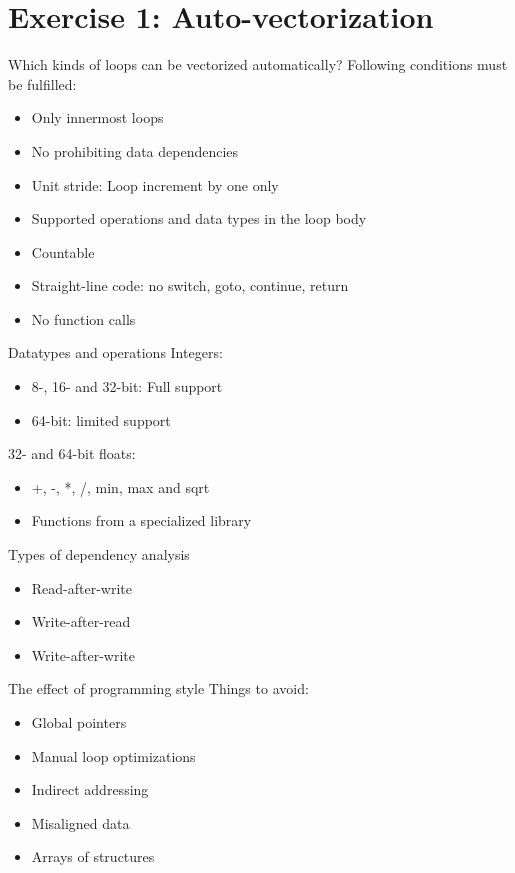 \section{Exercise 1: Auto-vectorization}

\begin{frame}{Which kinds of loops can be vectorized automatically?}
Following conditions must be fulfilled:
\begin{itemize}
\item Only innermost loops
\item No prohibiting data dependencies
\item Unit stride: Loop increment by one only
\item Supported operations and data types in the loop body
\item Countable
\item Straight-line code: no switch, goto, continue, return
\item No function calls
\end{itemize}
\end{frame}


\begin{frame}{Datatypes and operations}
Integers: 
\begin{itemize}
	\item 8-, 16- and 32-bit: Full support
	\item 64-bit: limited support
\end{itemize}
32- and 64-bit floats: 
\begin{itemize}
	\item +, -, *, /, min, max and sqrt
	\item Functions from a specialized library
\end{itemize}
\end{frame}

\begin{frame}{Types of dependency analysis}
\begin{itemize}
	\item Read-after-write
	\item Write-after-read
	\item Write-after-write
\end{itemize}
\end{frame}


\begin{frame}{The effect of programming style}
Things to avoid:
\begin{itemize}
	\item Global pointers
	\item Manual loop optimizations
	\item Indirect addressing
	\item Misaligned data
	\item Arrays of structures
\end{itemize}
\end{frame}

